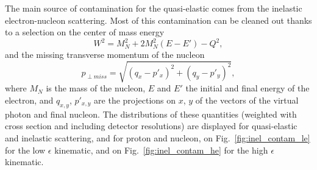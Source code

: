 \iffalse
The main source of contamination for the quasi-elastic comes from the inelastic electron-nucleon scattering. Most of this contamination can be cleaned out thanks to a selection on the center of mass energy
%
\begin{equation}
  W^2 = M_{N}^2+2M_{N}^{2}(E-E')-Q^2, %
\end{equation}
%
and the missing transverse momentum of the nucleon
%
\begin{equation}
  p_{\perp miss} = \sqrt{(q_{x}-p'_{x})^2+(q_{y}-p'_{y})^2},
\end{equation}
%
where $M_N$ is the mass of the nucleon, $E$ and $E'$ the initial and final energy of the electron, and $q_{x,y}$, $p'_{x, y}$ are the projections on $x$, $y$ of the vectors of the virtual photon and final nucleon.
The distributions of these quantities (weighted with cross section and including detector resolutions) are displayed for quasi-elastic and inelastic scattering, and for proton and nucleon, on Fig.~\ref{fig:inel_contam_le} for the low $\epsilon$ kinematic, and on Fig.~\ref{fig:inel_contam_he} for the high $\epsilon$ kinematic.\par
